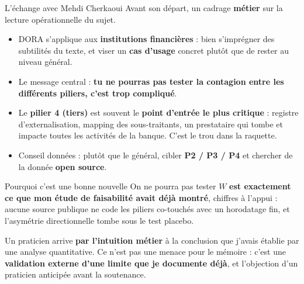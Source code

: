 \documentclass[11pt]{beamer}
\begin{document}
\begin{frame}{L'échange avec Mehdi Cherkaoui}
Avant son départ, un cadrage \textbf{métier} sur la lecture opérationnelle du sujet.
\begin{itemize}
\item DORA s'applique aux \textbf{institutions financières} : bien s'imprégner des
      subtilités du texte, et viser un \textbf{cas d'usage} concret plutôt que de rester
      au niveau général.
\item Le message central : \textbf{\og{}tu ne pourras pas tester la contagion entre les
      différents piliers, c'est trop compliqué\fg{}}.
\item Le \textbf{pilier 4 (tiers)} est souvent le \textbf{point d'entrée le plus critique}
      : registre d'externalisation, mapping des sous-traitants, un prestataire qui tombe
      et impacte toutes les activités de la banque. C'est \og{}le trou dans la raquette\fg.
\item Conseil données : plutôt que le général, cibler \textbf{P2 / P3 / P4} et chercher
      de la donnée \textbf{open source}.
\end{itemize}
\end{frame}

\begin{frame}{Pourquoi c'est une bonne nouvelle}
\og{}On ne pourra pas tester $W$\fg{} \textbf{est exactement ce que mon étude de
faisabilité avait déjà montré}, chiffres à l'appui : aucune source publique ne code les
piliers co-touchés avec un horodatage fin, et l'asymétrie directionnelle tombe sous le
test placebo.
\vfill
\begin{block}{}
Un praticien arrive \textbf{par l'intuition métier} à la conclusion que j'avais établie
par une analyse quantitative. Ce n'est pas une menace pour le mémoire : c'est une
\textbf{validation externe d'une limite que je documente déjà}, et l'objection d'un
praticien anticipée avant la soutenance.
\end{block}
\end{frame}
\end{document}
